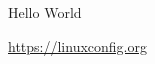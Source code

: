 \documentclass{article}
\begin{document}
Hello World \Latex

\url{https://linuxconfig.org}
\end{document}
